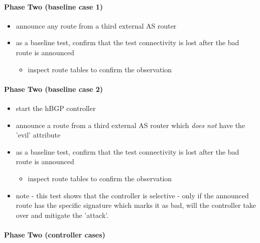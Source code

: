 \paragraph{Phase Two (baseline case 1)}
\begin{itemize}
    \item announce any route from a third external AS router
    \item as a baseline test, confirm that the test connectivity is lost after the bad route is announced
    \begin{itemize}
    \item inspect route tables to confirm the observation
    \end{itemize}
\end{itemize}

\paragraph{Phase Two (baseline case 2)}

\begin{itemize}
    \item start the hBGP controller
    \item announce a route from a third external AS router which \textit{does not} have the 'evil' attribute
    \item as a baseline test, confirm that the test connectivity is lost after the bad route is announced
    \begin{itemize}
    \item inspect route tables to confirm the observation
    \end{itemize}
    \item note - this test shows that the controller is selective - only if the announced route has the specific signature which marks it as bad, will the controller take over and mitigate the 'attack'.
\end{itemize}

\paragraph{Phase Two (controller cases)}

